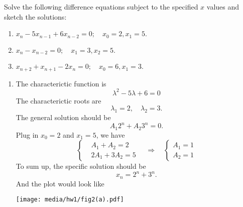 \documentclass[
    classnum=MATH564,
    classname=MATHEMATICAL\ MODELING,
    due=January\ 28\,\ 2020,
    author=Gabrielle\ Streeter\qquad Hannah\ Wu\qquad\ Minghang\ Li,
    authorshort=Streeter\ \&\ Wu\ \&\ Li,
    teacher= Zachary\ M.\ Boyd,
    hw=1
]{hw-template}
\newenvironment{Figure}
  {\par\medskip\noindent\minipage{\linewidth}}
  {\endminipage\par\medskip}
\begin{document}
\begin{homeworkProblem}
Solve the following difference equations subject to the specified $x$ values and
sketch the solutions:
\begin{enumerate}
    \item $x_n - 5x_{n-1} + 6x_{n-2} = 0;\quad x_0 = 2, x_1 = 5.$
    \addtocounter{enumi}{1}
    \item $x_n - x_{n-2} = 0;\quad x_1 = 3, x_2 = 5.$
    \addtocounter{enumi}{1}
    \item $x_{n+2} + x_{n+1} - 2x_n = 0; \quad x_0 = 6, x_1 = 3.$
\end{enumerate}

\segline

\solution

\begin{enumerate}
    \item The characterictic function is \[
        \lambda^2 - 5\lambda + 6 = 0
    \]
    The characterictic roots are \[
        \lambda_1 = 2, \quad \lambda_2 = 3.
    \]
    The general solution should be \[
        A_1 2^n + A_2 3^n  = 0.
    \]
    Plug in $x_0 = 2$ and $x_1 = 5$, we have \[
        \left\{
        \begin{aligned}
            &A_1 + A_2  = 2\\
            &2A_1  + 3A_2 = 5
        \end{aligned}
        \right.
        \quad
        \Rightarrow
        \quad
        \left\{
        \begin{aligned}
            A_1 = 1\\
            A_2 = 1
        \end{aligned}
        \right.
    \]
    To sum up, the specific solution should be $$
        x_n = 2^n + 3^n.
    $$
    And the plot would look like
    \begin{Figure}
        \centering
        \texttt{[image: media/hw1/fig2(a).pdf]}
    \end{Figure}
    \addtocounter{enumi}{1}


\end{enumerate}
\end{homeworkProblem}
\end{document}
